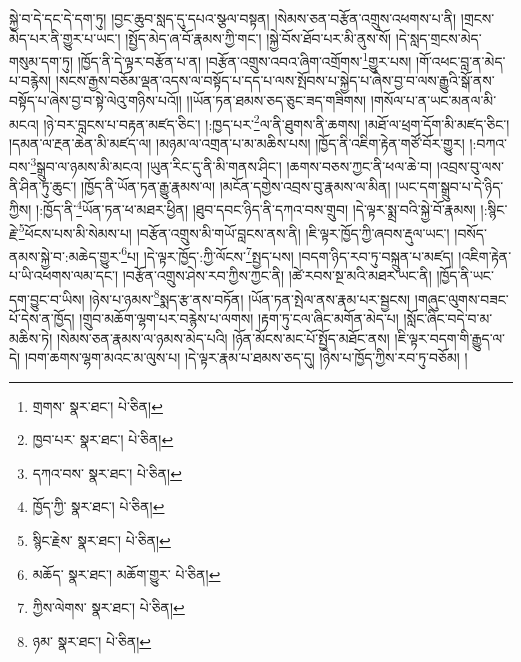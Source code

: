 སྐྱེ་བ་དེ་དང་དེ་དག་ཏུ། །བྱང་ཆུབ་སླད་དུ་དཔའ་སྩལ་བསྟན། །སེམས་ཅན་བརྩོན་འགྲུས་འཕགས་པ་ནི། །གྲངས་མེད་པར་ནི་གྱུར་པ་ཡང་། །སྤྱོད་མེད་ཞ་བོ་རྣམས་ཀྱི་གང་། །སྐྱེ་བོས་ཐོབ་པར་མི་ནུས་སོ། །དེ་སླད་གྲངས་མེད་གསུམ་དག་ཏུ། །ཁྱོད་ནི་དེ་ལྟར་བརྩོན་པ་ན། །བརྩོན་འགྲུས་འབའ་ཞིག་འགྲོགས་\footnote{གྲགས་  སྣར་ཐང་།  པེ་ཅིན། }གྱུར་པས། །གོ་འཕང་བླ་ན་མེད་པ་བརྙེས། །སངས་རྒྱས་བཅོམ་ལྡན་འདས་ལ་བསྟོད་པ་དད་པ་ལས་སྤོབས་པ་སྐྱེད་པ་ཞེས་བྱ་བ་ལས་རྒྱུའི་སྒོ་ནས་བསྟོད་པ་ཞེས་བྱ་བ་སྟེ་ལེའུ་གཉིས་པའོ།། །།ཡོན་ཏན་ཐམས་ཅད་ཅུང་ཟད་གཟིགས། །གསོལ་པ་ན་ཡང་མནལ་མི་མངའ། །ཉེ་བར་བླངས་པ་བརྟན་མཛད་ཅིང་། །:ཁྱད་པར་\footnote{ཁྱབ་པར་  སྣར་ཐང་།  པེ་ཅིན། }ལ་ནི་ཐུགས་ནི་ཆགས། །མཐོ་ལ་ཕྲག་དོག་མི་མཛད་ཅིང་། །དམན་ལ་རྔན་ཆེན་མི་མཛད་ལ། །མཉམ་ལ་འགྲན་པ་མ་མཆིས་པས། །ཁྱོད་ནི་འཇིག་རྟེན་གཙོ་བོར་གྱུར། །:བཀའ་བས་\footnote{དཀའ་བས་  སྣར་ཐང་།  པེ་ཅིན། }སྒྲུབ་ལ་ཉམས་མི་མངའ། །ཡུན་རིང་དུ་ནི་མི་གནས་ཤིང་། །ཆགས་བཅས་ཀྱང་ནི་ཕལ་ཆེ་བ། །འབྲས་བུ་ལས་ནི་ཤིན་ཏུ་ཆུང་། །ཁྱོད་ནི་ཡོན་ཏན་རྒྱུ་རྣམས་ལ། །མངོན་དགྱེས་འབྲས་བུ་རྣམས་ལ་མིན། །ཡང་དག་སྒྲུབ་པ་དེ་ཉིད་ཀྱིས། །:ཁྱོད་ནི་\footnote{ཁྱོད་ཀྱི་  སྣར་ཐང་།  པེ་ཅིན། }ཡོན་ཏན་ཕ་མཐར་ཕྱིན། །ཐུབ་དབང་ཉིད་ནི་དཀའ་བས་གྲུབ། །དེ་ལྟར་སྨྲ་བའི་སྐྱེ་བོ་རྣམས། །:སྙིང་རྗེ་\footnote{སྙིང་རྗེས་  སྣར་ཐང་།  པེ་ཅིན། }ཕོངས་པས་མི་སེམས་པ། །བརྩོན་འགྲུས་མི་གཡོ་བླངས་ནས་ནི། །ཇི་ལྟར་ཁྱོད་ཀྱི་ཞབས་རྡུལ་ཡང་། །བསོད་ནམས་སྐྱེ་བ་:མཆེད་གྱུར་\footnote{མཆོད་  སྣར་ཐང་། མཆོག་གྱུར་  པེ་ཅིན། }པ། །དེ་ལྟར་ཁྱོད་:ཀྱི་ལོངས་\footnote{ཀྱིས་ལེགས་  སྣར་ཐང་།  པེ་ཅིན། }སྤྱད་པས། །བདག་ཉིད་རབ་ཏུ་བསྐྲུན་པ་མཛད། །འཇིག་རྟེན་པ་ཡི་འཕགས་ལམ་དང་། །བརྩོན་འགྲུས་ཤེས་རབ་ཀྱིས་ཀྱང་ནི། །ཚེ་རབས་སྔ་མའི་མཐར་ཡང་ནི། །ཁྱོད་ནི་ཡང་དག་བྱུང་བ་ཡིས། །ཉེས་པ་ཉམས་\footnote{ཉམ་  སྣར་ཐང་།  པེ་ཅིན། }སྨད་རྩ་ནས་བཏོན། །ཡོན་ཏན་སྤེལ་ནས་རྣམ་པར་སྦྱངས། །གཞུང་ལུགས་བཟང་པོ་དེས་ན་ཁྱོད། །གྲུབ་མཆོག་ལྷག་པར་བརྙེས་པ་ལགས། །རྟག་ཏུ་ངལ་ཞིང་མགོན་མེད་པ། །སློང་ཞིང་བདེ་བ་མ་མཆིས་ཏེ། །སེམས་ཅན་རྣམས་ལ་ཉམས་མེད་པའི། །ཉོན་མོངས་མང་པོ་སྤྱོད་མཐོང་ནས། །ཇི་ལྟར་བདག་གི་རྒྱུད་ལ་དེ། །བག་ཆགས་ལྷག་མའང་མ་ལུས་པ། །དེ་ལྟར་རྣམ་པ་ཐམས་ཅད་དུ། །ཉེས་པ་ཁྱོད་ཀྱིས་རབ་ཏུ་བཅོམ། །
